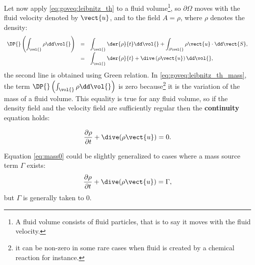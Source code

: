 Let now apply \eqref{eq:goveq:leibnitz_th} to a fluid volume\footnote{%
A fluid volume consists of fluid particles, that is to say it moves with the fluid velocity.
},
so $\partial \Omega$ moves with the fluid velocity denoted by $\vect{u}$, and to the field
$A= \rho$, where $\rho$ denotes the density:
%
 \begin{equation}\label{eq:goveq:leibnitz_th_mass}
\begin{array}{r c l}
\displaystyle \DP{} \left( \int_{\vol{}} \rho \dd \vol{}\right) &=& 
\displaystyle \int_{\vol{}} \der{\rho}{t} \dd \vol{} + \int_{\partial \vol{}} \rho  \vect{u} \cdot  \dd \vect{S}, \\
\displaystyle &=&
\displaystyle \int_{\vol{ }} \der{\rho}{t} + \dive \left( \rho \vect{u} \right)  \dd \vol{},
\end{array}
 \end{equation}
the second line is obtained using Green relation. In \eqref{eq:goveq:leibnitz_th_mass}, the term
$\DP{} \left( \int_{\vol{} }\rho \dd \vol{}\right) $ is zero because\footnote{
it can be non-zero in some rare cases when fluid is created by a chemical reaction for instance.
}
 it is the variation of the mass of a fluid volume. This equality is true for any fluid volume, so
 if the density field and the velocity field are sufficiently regular then the \textbf{continuity} equation holds:
 
\begin{equation}\label{eq:mass0}
\dfrac{\partial \rho}{\partial t} + \dive(\rho \vect{u})=0.
\end{equation}

Equation \eqref{eq:mass0} could be slightly generalized to cases where a mass source term $\Gamma$ 
exists:
\begin{equation}\label{eq:mass}
\dfrac{\partial \rho}{\partial t} + \dive(\rho \vect{u})=\Gamma,
\end{equation}
but $\Gamma$ is generally taken to $0$.

